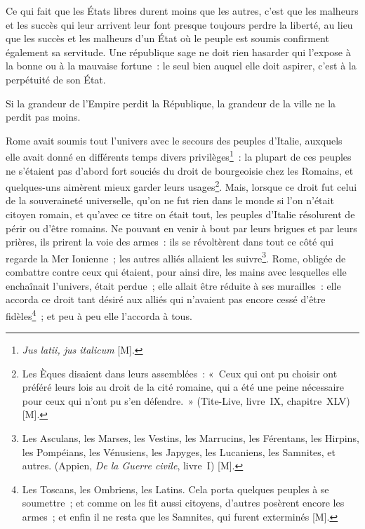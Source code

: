 \documentclass[french,twoside]{book} %
\begin{document}
Ce qui fait que les États libres durent moins que les autres, c’est que les malheurs et les succès qui leur arrivent leur font presque toujours perdre la liberté, au lieu que les succès et les malheurs d’un État où le peuple est soumis confirment également sa servitude. Une république sage ne doit rien hasarder qui l’expose à la bonne ou à la mauvaise fortune : le seul bien auquel elle doit aspirer, c’est à la perpétuité de son État.\par
Si la grandeur de l’Empire perdit la République, la grandeur de la ville ne la perdit pas moins.\par
Rome avait soumis tout l’univers avec le secours des peuples d’Italie, auxquels elle avait donné en différents temps divers privilèges\footnote{{\itshape Jus latii, jus italicum} [M].} : la plupart de ces peuples ne s’étaient pas d’abord fort souciés du droit de bourgeoisie chez les Romains, et quelques-uns aimèrent mieux garder leurs usages\footnote{Les Èques disaient dans leurs assemblées : « Ceux qui ont pu choisir ont préféré leurs lois au droit de la cité romaine, qui a été une peine nécessaire pour ceux qui n’ont pu s’en défendre. » (Tite-Live, livre IX, chapitre XLV) [M].}. Mais, lorsque ce droit fut celui de la souveraineté universelle, qu’on ne fut rien dans le monde si l’on n’était citoyen romain, et qu’avec ce titre on était tout, les peuples d’Italie résolurent de périr ou d’être romains. Ne pouvant en venir à bout par leurs brigues et par leurs prières, ils prirent la voie des armes : ils se révoltèrent dans tout ce côté qui regarde la Mer Ionienne ; les autres alliés allaient les suivre\footnote{Les Asculans, les Marses, les Vestins, les Marrucins, les Férentans, les Hirpins, les Pompéians, les Vénusiens, les Japyges, les Lucaniens, les Samnites, et autres. (Appien, {\itshape De la Guerre civile}, livre I) [M].}. Rome, obligée de combattre contre ceux qui étaient, pour ainsi dire, les mains avec lesquelles elle enchaînait l’univers, était perdue ; elle allait être réduite à ses murailles : elle accorda ce droit tant désiré aux alliés qui n’avaient pas encore cessé d’être fidèles\footnote{Les Toscans, les Ombriens, les Latins. Cela porta quelques peuples à se soumettre ; et comme on les fit aussi citoyens, d’autres posèrent encore les armes ; et enfin il ne resta que les Samnites, qui furent exterminés [M].} ; et peu à peu elle l’accorda à tous.\par
\end{document}
